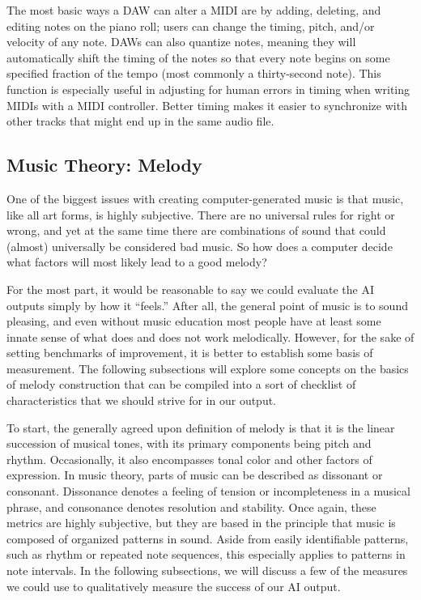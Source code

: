The most basic ways a DAW can alter a MIDI are by adding, deleting, and editing notes on
the piano roll; users can change the timing, pitch, and/or velocity of any note. DAWs can
also quantize notes, meaning they will automatically shift the timing of the notes so that
every note begins on some specified fraction of the tempo (most commonly a thirty-second
note). This function is especially useful in adjusting for human errors in timing when
writing MIDIs with a MIDI controller. Better timing makes it easier to synchronize with
other tracks that might end up in the same audio file.

\subsection{Music Theory: Melody}

One of the biggest issues with creating computer-generated music is that music, like all art
forms, is highly subjective. There are no universal rules for right or wrong, and yet at the
same time there are combinations of sound that could (almost) universally be considered bad music.
So how does a computer decide what factors will most likely lead to a good melody?

For the most part, it would be reasonable to say we could evaluate the AI outputs simply by how it
“feels.” After all, the general point of music is to sound pleasing, and even without music
education most people have at least some innate sense of what does and does not work melodically.
However, for the sake of setting benchmarks of improvement, it is better to establish some basis of
measurement. The following subsections will explore some concepts on the basics of melody
construction that can be compiled into a sort of checklist of characteristics that we should strive
for in our output.

To start, the generally agreed upon definition of melody is that it is the linear succession
of musical tones, with its primary components being pitch and rhythm. Occasionally, it also
encompasses tonal color and other factors of expression.\autocite{melody} In music theory, parts
of music can be described as dissonant or consonant. Dissonance denotes a feeling of tension or
incompleteness in a musical phrase, and consonance denotes resolution and stability. Once again,
these metrics are highly subjective, but they are based in the principle that music is composed
of organized patterns in sound.\autocite{musiciansArithmetic} Aside from easily identifiable
patterns, such as rhythm or repeated note sequences, this especially applies to patterns in note
intervals. In the following subsections, we will discuss a few of the measures we could use to
qualitatively measure the success of our AI output.

